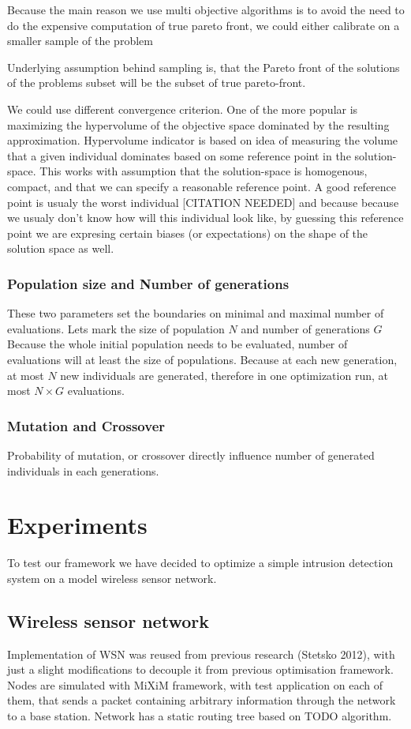 \documentclass[12pt,oneside,draft]{fithesis2}
\begin{document}
Because the main reason we use multi objective algorithms is to avoid the need to do the expensive computation of true pareto front,
we could either calibrate on a smaller sample of the problem

Underlying assumption behind sampling is, that the Pareto front of the solutions of the problems subset will be the subset of true pareto-front. 

We could use different convergence criterion. One of the more popular is maximizing the hypervolume of the objective space dominated by the resulting approximation. Hypervolume indicator is based on idea of measuring the volume that a given individual dominates based on some reference point in the solution-space. This works with assumption that the solution-space is homogenous, compact, and that we can specify a reasonable reference point. A good reference point is usualy the worst individual [CITATION NEEDED] and because because we usualy don't know how will this individual look like, by guessing this reference point we are expresing certain biases (or expectations) on the shape of the solution space as well.

\subsection{Population size and Number of generations}
These two parameters set the boundaries on minimal and maximal number of evaluations. Lets mark the size of population $N$ and number of generations $G$ Because the whole initial population needs to be evaluated, number of evaluations will at least the size of populations.
Because at each new generation, at most $N$ new individuals are generated, therefore in one optimization run, at most $N \times G$ evaluations.

\subsection{Mutation and Crossover}
Probability of mutation, or crossover directly influence number of generated individuals in each generations.


\chapter{Experiments}
To test our framework we have decided to optimize a simple intrusion detection system on a model wireless sensor network.

\section{Wireless sensor network}
Implementation of WSN was reused from previous research (Stetsko 2012), with just a slight modifications to decouple it from previous optimisation framework. Nodes are simulated with MiXiM framework, with test application on each of them, that sends a packet containing arbitrary information through the network to a base station. Network has a static routing tree based on TODO algorithm. 
\end{document}
